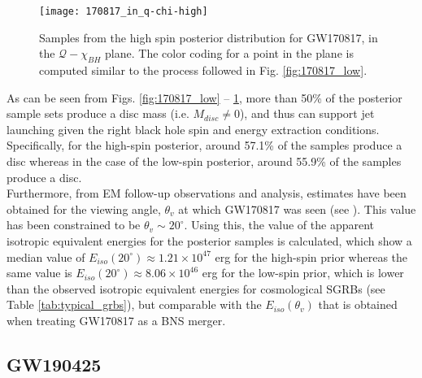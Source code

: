         \begin{figure}[ht]
            \centering
            \texttt{[image: 170817\_in\_q-chi-high]}
            \caption[$M_{disc}$ for GW170817's High Spin Posterior Distribution]
            {
                Samples from the high spin posterior distribution for GW170817, in the
                $\mathcal{Q}-\chi_{BH}$ plane. The color coding for a point in the plane
                is computed similar to the process followed in Fig.
                \ref{fig:170817_low}.
            }
            \label{fig:170817_high}
        \end{figure}

    As can be seen from Figs. \ref{fig:170817_low} -- \ref{fig:170817_high}, more than
    50\% of the posterior sample sets produce a disc mass (i.e. $M_{disc} \neq 0$), and
    thus can support jet launching given the right black hole spin and energy extraction
    conditions. Specifically, for the high-spin posterior, around 57.1\% of the samples
    produce a disc whereas in the case of the low-spin posterior, around 55.9\% of the
    samples produce a disc.\\
    Furthermore, from EM follow-up observations and analysis, estimates have been
    obtained for the viewing angle, $\theta_v$ at which GW170817 was seen (see
    \cite{finstad_2018}). This value has been constrained to be $\theta_v \sim
    20^{\circ}$. Using this, the value of the apparent isotropic equivalent energies for
    the posterior samples is calculated, which show a median value of
    $E_{iso}(20^{\circ}) \approx 1.21 \times 10^{47}$ erg for the high-spin prior
    whereas the same value is $E_{iso}(20^{\circ}) \approx 8.06 \times 10^{46}$ erg for
    the low-spin prior, which is lower than the observed isotropic equivalent energies
    for cosmological SGRBs (see Table \ref{tab:typical_grbs}), but comparable with the
    $E_{iso}(\theta_v)$ that is obtained when treating GW170817 as a BNS merger.

    \subsection{GW190425}\label{ssec:nsbh_190425}

